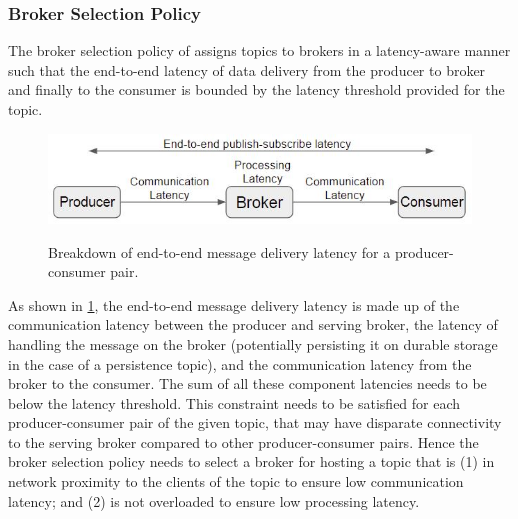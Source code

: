\subsubsection{Broker Selection Policy}
The broker selection policy of \epulsar{} assigns topics to brokers in a latency-aware manner such that the end-to-end latency of data delivery from the producer to broker and finally to the consumer is bounded by the latency threshold provided for the topic. 
\begin{figure}[h]
\centering
\includegraphics[width=0.75\columnwidth]{figures/epulsar/e2e_latency_breakdown.JPG}
\label{fig:e2e_latency_breakdown}
\caption{Breakdown of end-to-end message delivery latency for a producer-consumer pair.}
\end{figure}
As shown in \cref{fig:e2e_latency_breakdown}, the end-to-end message delivery latency is made up of the communication latency between the producer and serving broker, the latency of handling the message on the broker (potentially persisting it on durable storage in the case of a persistence topic), and the communication latency from the broker to the consumer. The sum of all these component latencies needs to be below the latency threshold. This constraint needs to be satisfied for each producer-consumer pair of the given topic, that may have disparate connectivity to the serving broker compared to other producer-consumer pairs. Hence the broker selection policy needs to select a broker for hosting a topic that is (1) in network proximity to the clients of the topic to ensure low communication latency; and (2) is not overloaded to ensure low processing latency.

